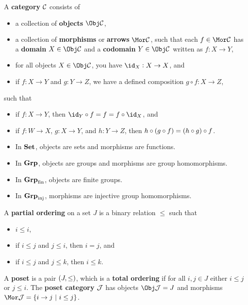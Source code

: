 \begin{definition}
A \textbf{category} $ \mathcal{C} $ consists of
\begin{itemize}
\item a collection of \textbf{objects} $ \Obj \CCC $,
\item a collection of \textbf{morphisms} or \textbf{arrows} $ \Mor \CCC $, such that each $ f \in \Mor \CCC $ has a \textbf{domain} $ X \in \Obj \CCC $ and a \textbf{codomain} $ Y \in \Obj \CCC $ written as $ f : X \to Y $,
\item for all objects $ X \in \Obj \CCC $, you have $ \id_X : X \to X $, and
\item if $ f : X \to Y $ and $ g : Y \to Z $, we have a defined composition $ g \circ f : X \to Z $,
\end{itemize}
such that
\begin{itemize}
\item if $ f : X \to Y $, then $ \id_Y \circ f = f = f \circ \id_X $, and
\item if $ f : W \to X $, $ g : X \to Y $, and $ h : Y \to Z $, then $ h \circ \br{g \circ f} = \br{h \circ g} \circ f $.
\end{itemize}
\end{definition}

\pagebreak

\begin{example}
\hfill
\begin{itemize}
\item In $ \textbf{Set} $, objects are sets and morphisms are functions.
\item In $ \textbf{Grp} $, objects are groups and morphisms are group homomorphisms.
\item In $ \textbf{Grp}_{\text{fin}} $, objects are finite groups.
\item In $ \textbf{Grp}_{\text{inj}} $, morphisms are injective group homomorphisms.
\end{itemize}
\end{example}

\begin{definition}
A \textbf{partial ordering} on a set $ J $ is a binary relation $ \le $ such that
\begin{itemize}
\item $ i \le i $,
\item if $ i \le j $ and $ j \le i $, then $ i = j $, and
\item if $ i \le j $ and $ j \le k $, then $ i \le k $.
\end{itemize}
A \textbf{poset} is a pair $ \br{J, \le} $, which is a \textbf{total ordering} if for all $ i, j \in J $ either $ i \le j $ or $ j \le i $. The \textbf{poset category} $ \mathcal{J} $ has objects $ \Obj \JJJ = J $ and morphisms $ \Mor \JJJ = \cbr{i \to j \st i \le j} $.
\end{definition}

